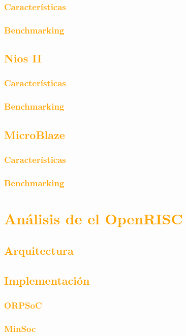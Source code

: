 \documentclass[a4paper,11pt]{article}
\begin{document}
		\subsubsection{\textcolor{orange}{Características}}
		\subsubsection{\textcolor{orange}{Benchmarking}}
	\subsection{\textcolor{orange}{Nios II}}
		\subsubsection{\textcolor{orange}{Características}}
		\subsubsection{\textcolor{orange}{Benchmarking}}
	\subsection{\textcolor{orange}{MicroBlaze}}
		\subsubsection{\textcolor{orange}{Características}}
		\subsubsection{\textcolor{orange}{Benchmarking}}

\section{\textcolor{orange}{Análisis de el OpenRISC }}
		\subsection{\textcolor{orange}{Arquitectura}}
		\subsection{\textcolor{orange}{Implementación}}
			\subsubsection{\textcolor{orange}{ORPSoC}}
			\subsubsection{\textcolor{orange}{MinSoc}}
\end{document}
